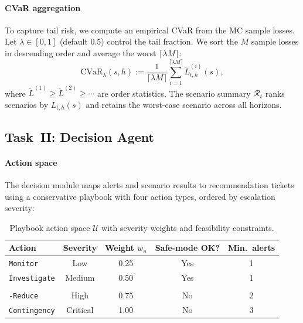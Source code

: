 \paragraph{CVaR aggregation}
To capture tail risk, we compute an empirical CVaR from the MC sample losses. Let $\lambda\in[0,1]$ (default $0.5$) control the tail fraction. We sort the $M$ sample losses in descending order and average the worst $\lceil \lambda M \rceil$:
\begin{equation}
\label{eq:cvar}
\mathrm{CVaR}_\lambda(s,h) := \frac{1}{\lceil \lambda M \rceil} \sum_{i=1}^{\lceil \lambda M \rceil} \widetilde{L}^{(i)}_{t,h}(s),
\end{equation}
where $\widetilde{L}^{(1)} \ge \widetilde{L}^{(2)} \ge \cdots$ are order statistics. The scenario summary $\mathcal{R}_t$ ranks scenarios by $L_{t,h}(s)$ and retains the worst-case scenario across all horizons.

\subsection{Task~II: Decision Agent}
\label{subsec:decision_v1}

\paragraph{Action space}
The decision module maps alerts and scenario results to recommendation tickets using a conservative playbook with four action types, ordered by escalation severity:

\begin{table}[!t]
\centering
\footnotesize
\setlength{\tabcolsep}{4pt}
\begin{tabular}{lcccc}
\toprule
Action & Severity & Weight $w_u$ & Safe-mode OK? & Min.\ alerts \\
\midrule
\texttt{Monitor} & Low & 0.25 & Yes & 1 \\
\texttt{Investigate} & Medium & 0.50 & Yes & 1 \\
\makecell[l]{\texttt{Recommend}\\[-1pt]\texttt{-Reduce}} & High & 0.75 & No & 2 \\
\texttt{Contingency} & Critical & 1.00 & No & 3 \\
\bottomrule
\end{tabular}
\caption{Playbook action space $\mathcal{U}$ with severity weights and feasibility constraints.}
\label{tab:playbook}
\end{table}

